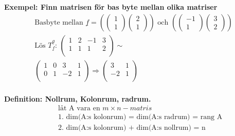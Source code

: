 \begin{multicols}{2}
\textbf{Exempel: Finn matrisen för bas byte mellan olika matriser} 
\begin{align*}
  &\quad  \text{Basbyte mellan } \underline{f} =
  \left( \begin{pmatrix} 1 \\ 1 \end{pmatrix} \begin{pmatrix} 2 \\ 1 \end{pmatrix} \right)
  \text{ och }
  \left( \begin{pmatrix} -1 \\ 1 \end{pmatrix} \begin{pmatrix} 3 \\ 2 \end{pmatrix} \right)
  &\quad  \\
  &\quad  \text{Lös } T^{\underline{g}}_{\underline{f}}: \,
  \left(\begin{array}{cc|cc}
    1 & 2 & -1 & 3  \\
    1 & 1 &  1 & 2  \\
  \end{array}\right) \sim{} \\
  &\quad
  \left(\begin{array}{cc|cc}
    1 & 0 &   3 & 1  \\
    0 & 1 &  -2 & 1  \\
  \end{array}\right) \Rightarrow{}
  \left(\begin{array}{cc}
    3 & 1  \\
   -2 & 1  \\
  \end{array}\right)  \\
\end{align*}


\textbf{Definition: Nollrum, Kolonrum, radrum.} 
\begin{align*}
  &\quad  \text{låt A vara en $m\times n-matris$} \\
  &\quad  \text{1. dim(A:s kolonrum) = dim(A:s radrum) = rang A} \\
  &\quad  \text{2. dim(A:s kolonrum) + dim(A:s nollrum) = n} \\
\end{align*}


\end{multicols}

